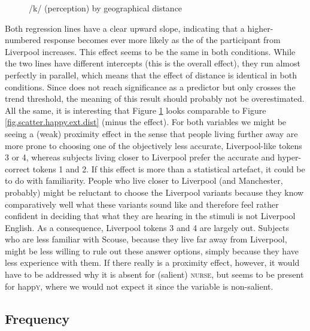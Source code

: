 \begin{figure}[h]
	\centering
		\resizebox{.49\linewidth}{!}{} 
	\caption{/k/ (perception) by geographical distance}
	\label{fig.scatter.k.ext.dist}
\end{figure}

Both regression lines have a clear upward slope, indicating that a higher-numbered response becomes ever more likely as the  of the participant from Liverpool increases.
This effect seems to be the same in both conditions.
While the two lines have different intercepts (this is the overall  effect), they run almost perfectly in parallel, which means that the effect of distance is identical in both conditions.
Since  does not reach significance as a predictor but only crosses the trend threshold, the meaning of this result should probably not be overestimated.
All the same, it is interesting that Figure \ref{fig.scatter.k.ext.dist} looks comparable to Figure \ref{fig.scatter.happy.ext.dist} (minus the  effect).
For both variables we might be seeing a (weak) proximity effect in the sense that people living further away are more prone to choosing one of the objectively less accurate, Liverpool-like tokens 3 or 4, whereas subjects living closer to Liverpool prefer the accurate and hyper-correct tokens 1 and 2.
If this effect is more than a statistical artefact, it could be to do with familiarity.
People who live closer to Liverpool (and Manchester, probably) might be reluctant to choose the Liverpool variants because they know comparatively well what these variants sound like and therefore feel rather confident in deciding that what they are hearing in the stimuli is not Liverpool English.
As a consequence, Liverpool tokens 3 and 4 are largely out.
Subjects who are less familiar with Scouse, because they live far away from Liverpool, might be less willing to rule out these answer options, simply because they have less experience with them.
If there really is a proximity effect, however, it would have to be addressed why it is absent for (salient) \textsc{nurse},  but seems to be present for happ\textsc{y}, where we would not expect it since the variable is non-salient.

\subsection{Frequency}
\label{sec.perc_res.k.frequency}

